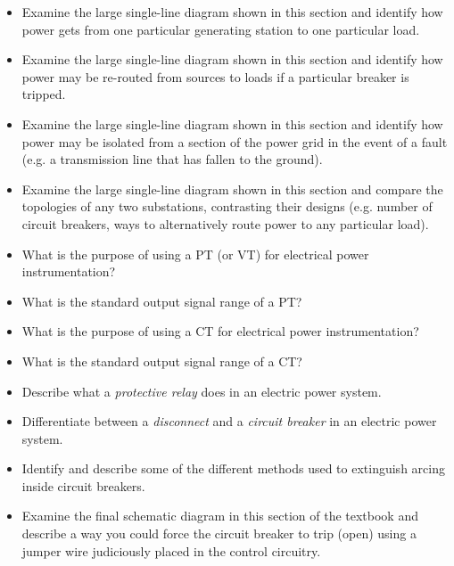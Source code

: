 \begin{itemize}
\item{} Examine the large single-line diagram shown in this section and identify how power gets from one particular generating station to one particular load.
\item{} Examine the large single-line diagram shown in this section and identify how power may be re-routed from sources to loads if a particular breaker is tripped.
\item{} Examine the large single-line diagram shown in this section and identify how power may be isolated from a section of the power grid in the event of a fault (e.g. a transmission line that has fallen to the ground).
\item{} Examine the large single-line diagram shown in this section and compare the topologies of any two substations, contrasting their designs (e.g. number of circuit breakers, ways to alternatively route power to any particular load).   
\item{} What is the purpose of using a PT (or VT) for electrical power instrumentation?
\item{} What is the standard output signal range of a PT?
\item{} What is the purpose of using a CT for electrical power instrumentation?
\item{} What is the standard output signal range of a CT?
\item{} Describe what a {\it protective relay} does in an electric power system.
\item{} Differentiate between a {\it disconnect} and a {\it circuit breaker} in an electric power system.
\item{} Identify and describe some of the different methods used to extinguish arcing inside circuit breakers.
\item{} Examine the final schematic diagram in this section of the textbook and describe a way you could force the circuit breaker to trip (open) using a jumper wire judiciously placed in the control circuitry.
\end{itemize}





